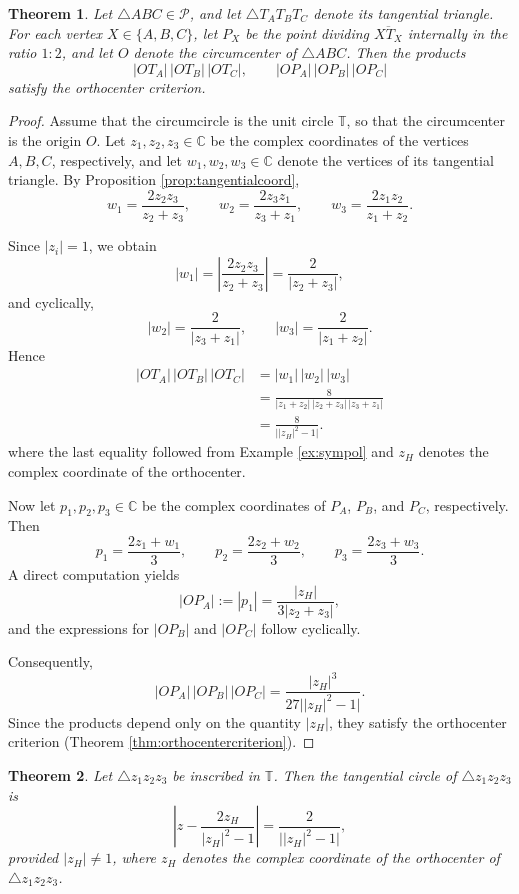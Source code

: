 \documentclass[11pt,reqno]{amsart}
\newtheorem{theorem}{Theorem}[section]
\theoremstyle{definition}
\numberwithin{equation}{section}
\begin{document}
\begin{theorem}
Let $\triangle ABC\in\mathcal P$, and let
$\triangle T_AT_BT_C$ denote its tangential triangle.
For each vertex $X \in \{A,B,C\}$, let $P_X$ be the point dividing
$\overline{XT_X}$ internally in the ratio $1:2$, and let $O$ denote the circumcenter of $\triangle ABC$. Then the products
\[
|OT_A|\,|OT_B|\,|OT_C|, \qquad
|OP_A|\,|OP_B|\,|OP_C|
\]
satisfy the orthocenter criterion.
\end{theorem}
\begin{proof}
Assume that the circumcircle is the unit circle
$\mathbb T$, so that the circumcenter is the origin $O$. Let $z_1,z_2,z_3 \in \mathbb C$ be the complex coordinates of the vertices $A,B,C$, respectively, 
and let $w_1,w_2,w_3 \in \mathbb C$ denote the vertices of its tangential triangle. By Proposition \ref{prop:tangentialcoord},
\[
w_1=\frac{2z_2z_3}{z_2+z_3},\qquad
w_2=\frac{2z_3z_1}{z_3+z_1},\qquad
w_3=\frac{2z_1z_2}{z_1+z_2}.
\]

Since $|z_i|=1$, we obtain
\[
|w_1|
=
\left|
\frac{2z_2z_3}{z_2+z_3}
\right|
=
\frac{2}{|z_2+z_3|},
\]
and cyclically,
\[
|w_2|
=
\frac{2}{|z_3+z_1|},
\qquad
|w_3|
=
\frac{2}{|z_1+z_2|}.
\]
Hence
\begin{align*}
    |OT_A|\,|OT_B|\,|OT_C|&=|w_1|\,|w_2|\,|w_3|\\
    &=\frac{8}
{|z_1+z_2|\,|z_2+z_3|\,|z_3+z_1|}\\
&=
\frac{8}{\bigl||z_H|^2-1\bigr|}.
\end{align*}
where the last equality followed from Example \eqref{ex:sympol} and $z_H$ denotes the complex coordinate of the orthocenter. 

Now let $p_1,p_2,p_3 \in \mathbb C$ be the complex coordinates of $P_A$, $P_B$, and $P_C$, respectively. Then
\[
p_1=\frac{2z_1+w_1}{3},\qquad
p_2=\frac{2z_2+w_2}{3},\qquad
p_3=\frac{2z_3+w_3}{3}.
\]
A direct computation yields
\[
|OP_A|
:= |p_1|=
\frac{|z_H|}
{3|z_2+z_3|},
\]
and the expressions for $|OP_B|$ and $|OP_C|$ follow cyclically.

Consequently,
\[
|OP_A|\,|OP_B|\,|OP_C|
=
\frac{|z_H|^3}
{27\bigl||z_H|^2-1\bigr|}.
\]
Since the products depend only on the quantity $|z_H|$, they satisfy the orthocenter criterion (Theorem \ref{thm:orthocentercriterion}). 
\end{proof}



\begin{theorem}\label{thm:tangcirc}
Let $\triangle z_1z_2z_3$ be inscribed in $\mathbb T$. Then the tangential circle of $\triangle z_1z_2z_3$ is
\[
\left|z-\frac{2z_H}{|z_H|^2-1}\right|
=
\frac{2}{\bigl||z_H|^2-1\bigr|},
\]
provided $|z_H|\neq1$, where $z_H$ denotes the complex coordinate of the orthocenter of $\triangle z_1z_2z_3$.
\end{theorem}
\end{document}
